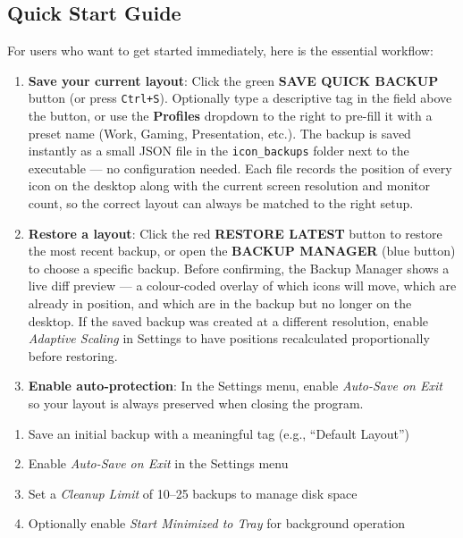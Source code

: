 \documentclass[a4paper,11pt]{article}
\begin{document}
\subsection{Quick Start Guide}

For users who want to get started immediately, here is the essential workflow:

\begin{enumerate}
  \item \textbf{Save your current layout}: Click the green
    \textbf{SAVE QUICK BACKUP} button (or press \texttt{Ctrl+S}).
    Optionally type a descriptive tag in the field above the button,
    or use the \textbf{Profiles} dropdown to the right to
    pre-fill it with a preset name (Work, Gaming, Presentation, etc.).
    The backup is saved instantly as a small JSON file in the
    \texttt{icon\_backups} folder next to the executable --- no
    configuration needed. Each file records the position of every
    icon on the desktop along with the current screen resolution
    and monitor count, so the correct layout can always be matched
    to the right setup.
  \item \textbf{Restore a layout}: Click the red \textbf{RESTORE LATEST}
    button to restore the most recent backup, or open the
    \textbf{BACKUP MANAGER} (blue button) to choose a specific backup.
    Before confirming, the Backup Manager shows a live diff preview
    --- a colour-coded overlay of which icons will move, which are
    already in position, and which are in the backup but no longer
    on the desktop. If the saved backup was created at a different
    resolution, enable \textit{Adaptive Scaling} in Settings to
    have positions recalculated proportionally before restoring.
  \item \textbf{Enable auto-protection}: In the Settings menu, enable
    \textit{Auto-Save on Exit} so your layout is always preserved
    when closing the program.
\end{enumerate}

\begin{successbox}
  \begin{enumerate}
    \item Save an initial backup with a meaningful tag (e.g.,
      ``Default Layout'')
    \item Enable \textit{Auto-Save on Exit} in the Settings menu
    \item Set a \textit{Cleanup Limit} of 10--25 backups to manage disk space
    \item Optionally enable \textit{Start Minimized to Tray} for
      background operation
  \end{enumerate}
\end{successbox}
\end{document}
